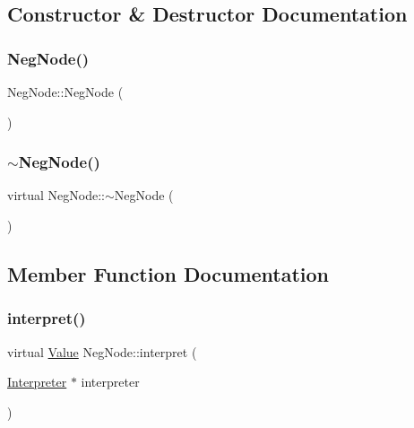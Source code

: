 \subsection{Constructor \& Destructor Documentation}
\mbox{\label{classNegNode_a543d2b5abde85cbcaca1e8927ec55c9e}} 
\subsubsection{\texorpdfstring{Neg\+Node()}{NegNode()}}
{\footnotesize\ttfamily Neg\+Node\+::\+Neg\+Node (\begin{DoxyParamCaption}{ }\end{DoxyParamCaption})}

\mbox{\label{classNegNode_aba880abbb0e47060985c5ec3e3e0c3fc}} 
\subsubsection{\texorpdfstring{$\sim$\+Neg\+Node()}{~NegNode()}}
{\footnotesize\ttfamily virtual Neg\+Node\+::$\sim$\+Neg\+Node (\begin{DoxyParamCaption}{ }\end{DoxyParamCaption})\hspace{0.3cm}{\ttfamily [virtual]}}



\subsection{Member Function Documentation}
\mbox{\label{classNegNode_a35ff48d55ab355e27f33dcc21483e4c7}} 
\subsubsection{\texorpdfstring{interpret()}{interpret()}}
{\footnotesize\ttfamily virtual \hyperlink{classValue}{Value} Neg\+Node\+::interpret (\begin{DoxyParamCaption}\item[{\hyperlink{classInterpreter}{Interpreter} $\ast$}]{interpreter }\end{DoxyParamCaption})\hspace{0.3cm}{\ttfamily [virtual]}}



